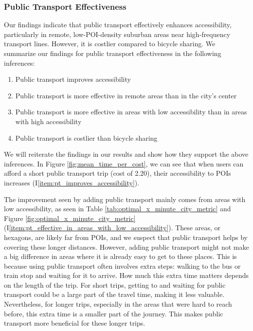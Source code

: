 \subsubsection{Public Transport Effectiveness}
Our findings indicate that public transport effectively enhances accessibility, particularly in remote, low-POI-density suburban areas near high-frequency transport lines. 
However, it is costlier compared to bicycle sharing.
We summarize our findings for public transport effectiveness in the following inferences:
\begin{enumerate}
  \renewcommand{\labelenumi}{I\theenumi.}
  \item Public transport improves accessibility \label{item:pt_improves_accessibility}
  \item Public transport is more effective in remote areas than in the city's center \label{item:pt_effective_in_remote_areas}
  \item Public transport is more effective in areas with low accessibility than in areas with high accessibility  \label{item:pt_effective_in_areas_with_low_accessibility}
  \item Public transport is costlier than bicycle sharing \label{item:pt_costlier_than_bicycle_sharing}
\end{enumerate}
We will reiterate the findings in our results and show how they support the above inferences.
In Figure \ref{fig:mean_time_per_cost}, we can see that when users can afford a short public transport trip (cost of 2.20), their accessibility to POIs increases (I\ref{item:pt_improves_accessibility}).

The improvement seen by adding public transport mainly comes from areas with low accessibility, as seen in Table \ref{tab:optimal_x_minute_city_metric} and Figure \ref{fig:optimal_x_minute_city_metric} (I\ref{item:pt_effective_in_areas_with_low_accessibility}).
These areas, or hexagons, are likely far from POIs, and we suspect that public transport helps by covering these longer distances. 
However, adding public transport might not make a big difference in areas where it is already easy to get to these places. 
This is because using public transport often involves extra steps: walking to the bus or train stop and waiting for it to arrive. 
How much this extra time matters depends on the length of the trip.
For short trips, getting to and waiting for public transport could be a large part of the travel time, making it less valuable. 
Nevertheless, for longer trips, especially in the areas that were hard to reach before, this extra time is a smaller part of the journey. 
This makes public transport more beneficial for these longer trips. 

